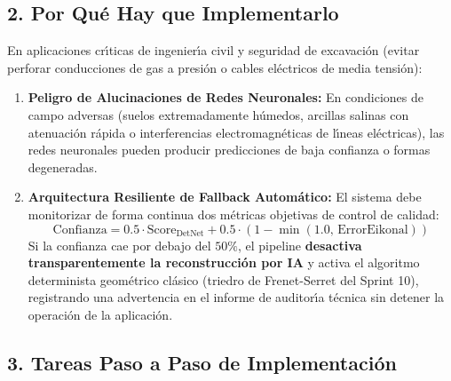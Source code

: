 \documentclass[11pt,a4paper]{article}
\begin{document}
\subsection{2. Por Qu{\'e} Hay que Implementarlo}
En aplicaciones cr{\'\i}ticas de ingenier{\'\i}a civil y seguridad de excavaci{\'o}n (evitar perforar conducciones de gas a presi{\'o}n o cables el{\'e}ctricos de media tensi{\'o}n):
\begin{enumerate}
    \item \textbf{Peligro de Alucinaciones de Redes Neuronales:} En condiciones de campo adversas (suelos extremadamente h{\'u}medos, arcillas salinas con atenuaci{\'o}n r{\'a}pida o interferencias electromagn{\'e}ticas de l{\'\i}neas el{\'e}ctricas), las redes neuronales pueden producir predicciones de baja confianza o formas degeneradas.
    \item \textbf{Arquitectura Resiliente de Fallback Autom{\'a}tico:}
    El sistema debe monitorizar de forma continua dos m{\'e}tricas objetivas de control de calidad:
    \begin{equation}
        \text{Confianza} = 0.5 \cdot \text{Score}_{\text{DetNet}} + 0.5 \cdot \left(1 - \min(1.0, \, \text{ErrorEikonal})\right)
    \end{equation}
    Si la confianza cae por debajo del $50\%$, el pipeline \textbf{desactiva transparentemente la reconstrucci{\'o}n por IA} y activa el algoritmo determinista geom{\'e}trico clásico (triedro de Frenet-Serret del Sprint 10), registrando una advertencia en el informe de auditor{\'\i}a t{\'e}cnica sin detener la operaci{\'o}n de la aplicaci{\'o}n.
\end{enumerate}

\subsection{3. Tareas Paso a Paso de Implementaci{\'o}n}
\end{document}
